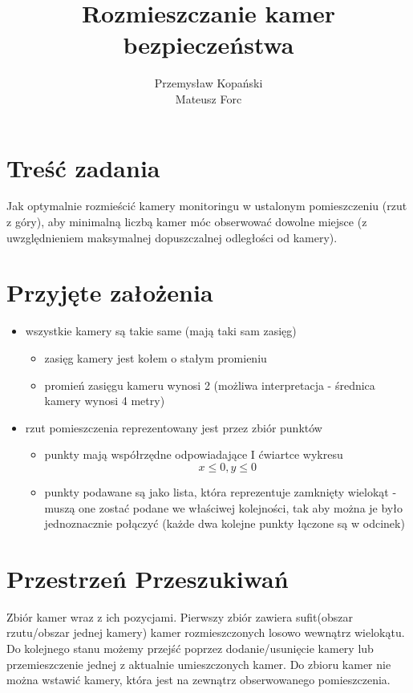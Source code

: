\documentclass[12pt,a4paper]{article}
\title{Rozmieszczanie kamer bezpieczeństwa}
\author{Przemysław Kopański \\ Mateusz Forc}
\begin{document}
\maketitle
\tableofcontents
\section{Treść zadania}
Jak optymalnie rozmieścić kamery monitoringu w ustalonym pomieszczeniu (rzut z góry),
aby minimalną liczbą kamer móc obserwować dowolne miejsce 
(z uwzględnieniem maksymalnej dopuszczalnej odległości od kamery).
%
\newpage
\section{Przyjęte założenia}
\begin{itemize}
\item wszystkie kamery są takie same (mają taki sam zasięg)
	\begin{itemize}
	\item zasięg kamery jest kołem o stałym promieniu
	\item promień zasięgu kameru wynosi 2 (możliwa interpretacja - średnica kamery wynosi 4 metry)
	\end{itemize}
\item rzut pomieszczenia reprezentowany jest przez zbiór punktów
	\begin{itemize}
	\item punkty mają współrzędne odpowiadające I ćwiartce wykresu \[x \leq 0, y \leq 0\]
	\item punkty podawane są jako lista, która reprezentuje zamknięty wielokąt - muszą one zostać
	      podane we właściwej kolejności, tak aby można je było jednoznacznie połączyć 
	      (każde dwa kolejne punkty łączone są w odcinek)
	\end{itemize}
\end{itemize}
%
\section{Przestrzeń Przeszukiwań}
Zbiór kamer wraz z ich pozycjami.
Pierwszy zbiór zawiera sufit(obszar rzutu/obszar jednej kamery) kamer
rozmieszczonych losowo wewnątrz wielokątu.
Do kolejnego stanu możemy przejść poprzez dodanie/usunięcie kamery lub przemieszczenie
jednej z aktualnie umieszczonych kamer.
Do zbioru kamer nie można wstawić kamery, która jest na zewnątrz obserwowanego pomieszczenia.
%
\newpage
\end{document}
